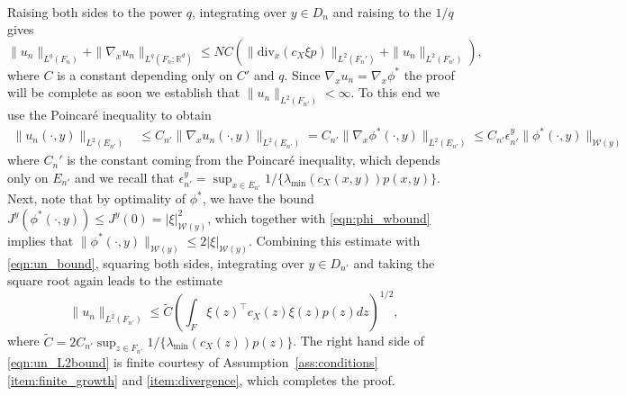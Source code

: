 \documentclass{article}
\makeatletter
\theoremstyle{plain}
\theoremstyle{definition}
\newcommand{\R}{\mathbb{R}}
\newcommand{\Wcal}{{\mathcal W}}
\numberwithin{lem}{section}
\renewenvironment{proof}[1][\proofname] {\par\pushQED{\qed}\normalfont\topsep6\p@\@plus6\p@\relax\trivlist\item[\hskip\labelsep\bfseries#1\@addpunct{.}]\ignorespaces}{\popQED\endtrivlist\@endpefalse}
\makeatother
\begin{document}
\begin{proof}
\begin{align}
 \end{align}
 Raising both sides to the power $q$, integrating over $y \in D_n$ and raising to the $1/q$ gives
 \[\|u_n\|_{L^q(F_n)} + \|\nabla_x u_n\|_{L^q(F_n;\R^d)}\leq NC(\|\mathrm{div}_x(c_X\xi p)\|_{L^2(F_n')} + \|u_n\|_{L^2(F_{n'})}), \]
 where $C$ is a constant depending only on $C'$ and $q$. Since $\nabla_x u_n = \nabla_x \phi^*$ the proof will be complete as soon we establish that $\|u_n\|_{L^2(F_{n'})} < \infty$. To this end we use the Poincar\'e inequality \cite[Theorem~5.8.1]{evanspartial2010} to obtain
 \begin{align}
     \|u_n(\cdot,y)\|_{L^2(E_{n'})} & \leq C_{n'}\|\nabla_x u_n(\cdot,y)\|_{L^2(E_{n'})} = C_{n'}\|\nabla_x \phi^* (\cdot,y)\|_{L^2(E_{n'})} \leq C_{n'}\epsilon_{n'}^y\|\phi^*(\cdot,y)\|_{\Wcal(y)}
     \label{eqn:un_bound}
 \end{align}
 where $C_n'$ is the constant coming from the Poincar\'e inequality, which depends only on $E_{n'}$ and we recall that $\epsilon_{n'}^y = \sup_{x \in E_{n'}} 1/\{\lambda_{\min}(c_X(x,y))p(x,y)\}$. Next, note that by optimality of $\phi^*$, we have the bound $J^y(\phi^*(\cdot,y)) \leq J^y(0) = |\xi|^2_{\Wcal(y)}$, which together with \eqref{eqn:phi_wbound} implies that $\|\phi^*(\cdot,y)\|_{\Wcal(y)} \leq 2|\xi|_{\Wcal(y)}$.
 Combining this estimate with \eqref{eqn:un_bound}, squaring both sides, integrating over $y \in D_{n'}$ and taking the square root again leads to the estimate 
 \begin{equation} \label{eqn:un_L2bound} 
 \|u_n\|_{L^2(F_{n'})} \leq \tilde C\left(\int_F\xi(z)^\top c_X(z)\xi(z)p(z)dz\right)^{1/2},
 \end{equation} where $\tilde C = 2C_{n'}\sup_{z \in F_{n'}} 1/\{\lambda_{\min}(c_X(z))p(z)\}$.
 The right hand side of \eqref{eqn:un_L2bound} is finite courtesy of Assumption~\ref{ass:conditions}\ref{item:finite_growth} and \ref{item:divergence}, which completes the proof.
\end{proof}
\end{document}

